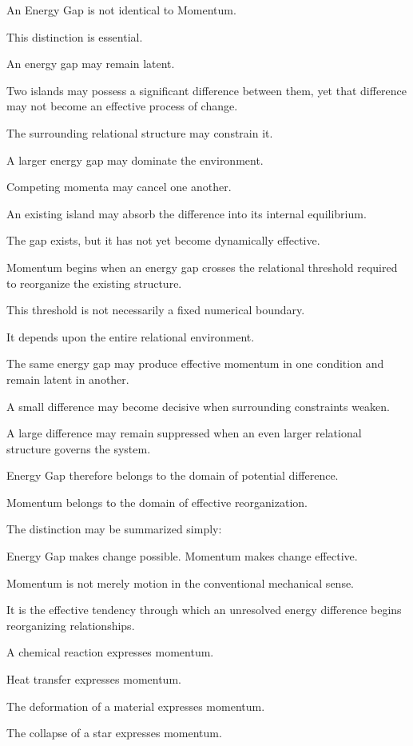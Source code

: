 An Energy Gap is not identical to Momentum.

This distinction is essential.

An energy gap may remain latent.

Two islands may possess a significant difference between them, yet that difference may not become an effective process of change.

The surrounding relational structure may constrain it.

A larger energy gap may dominate the environment.

Competing momenta may cancel one another.

An existing island may absorb the difference into its internal equilibrium.

The gap exists, but it has not yet become dynamically effective.

Momentum begins when an energy gap crosses the relational threshold required to reorganize the existing structure.

This threshold is not necessarily a fixed numerical boundary.

It depends upon the entire relational environment.

The same energy gap may produce effective momentum in one condition and remain latent in another.

A small difference may become decisive when surrounding constraints weaken.

A large difference may remain suppressed when an even larger relational structure governs the system.

Energy Gap therefore belongs to the domain of potential difference.

Momentum belongs to the domain of effective reorganization.

The distinction may be summarized simply:

Energy Gap makes change possible. Momentum makes change effective.

Momentum is not merely motion in the conventional mechanical sense.

It is the effective tendency through which an unresolved energy difference begins reorganizing relationships.

A chemical reaction expresses momentum.

Heat transfer expresses momentum.

The deformation of a material expresses momentum.

The collapse of a star expresses momentum.

